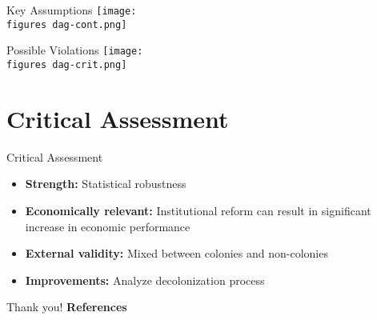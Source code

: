 \documentclass[10pt]{beamer}
\newcommand{\figures}{figures/}
\begin{document}
\begin{frame}{Key Assumptions}
  \centering
  \vspace{1em}
  \texttt{[image: \\figures dag-cont.png]}
\end{frame}

\begin{frame}{Possible Violations}
  \centering
  \vspace{1em}
  \texttt{[image: \\figures dag-crit.png]}
\end{frame}

\section{Critical Assessment}

\begin{frame}{Critical Assessment}
  \begin{itemize}
    \item \textbf{Strength:} Statistical robustness
    \item \textbf{Economically relevant:} Institutional reform can result in significant increase in economic performance
    \item \textbf{External validity:} Mixed between colonies and non-colonies
    \item \textbf{Improvements:} Analyze decolonization process
  \end{itemize}
\end{frame}

\begin{frame}{Thank you!}
  \textbf{\large{References}}

  \cite{acemoglu_2001}
\end{frame}
\end{document}
